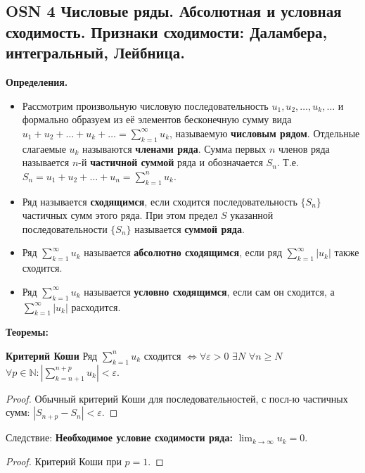 \subsection*{OSN 4 Числовые ряды. Абсолютная и условная сходимость. Признаки сходимости: Даламбера, интегральный, Лейбница.}

\textbf{Определения.}
\begin{itemize}
    \item Рассмотрим произвольную числовую последовательность $u_1,u_2,\dots,u_k,\dots$ и формально
    образуем из её элементов бесконечную сумму вида
    $u_1 +u_2 +\dots+u_k +\dots= \displaystyle \sum_{k=1}^{\infty}u_k$, называемую \textbf{числовым рядом}.
    Отдельные слагаемые $u_k$ называются \textbf{членами ряда}.
    Сумма первых $n$ членов ряда называется $n$-й \textbf{частичной суммой} ряда и обозначается $S_n$.
    Т.е. $S_n =u_1 +u_2 +\dots+u_n = \displaystyle \sum_{k=1}^n u_k$.
    \item Ряд называется \textbf{сходящимся}, если сходится последовательность $\{S_n\}$ частичных сумм этого ряда.
    При этом предел $S$ указанной последовательности $\{S_n\}$ называется \textbf{суммой ряда}.
    
    \item Ряд $\displaystyle \sum_{k=1}^{\infty}u_k$ называется \textbf{абсолютно сходящимся}, если ряд $\displaystyle \sum_{k=1}^{\infty}|u_k|$ также сходится.

    \item Ряд $\displaystyle \sum_{k=1}^{\infty}u_k$ называется \textbf{условно сходящимся}, если сам он сходится, а $\displaystyle \sum_{k=1}^{\infty}|u_k|$ расходится.
\end{itemize}

\textbf{Теоремы:}

\textbf{Критерий Коши} Ряд $\displaystyle \sum_{k=1}^n u_k$ сходится $\iff \forall \varepsilon > 0$ $\exists N$ $\forall n \geq N$ $ \forall p \in \mathbb{N} : \displaystyle \left|\sum_{k=n+1}^{n+p} u_k\right| < \varepsilon$.

\begin{proof}
    Обычный критерий Коши для последовательностей, с посл-ю частичных сумм: $|S_{n+p} - S_n| < \varepsilon$.
\end{proof}

Следствие: \textbf{Необходимое условие сходимости ряда:} $\lim_{k\rightarrow\infty} u_k=0$.

\begin{proof}
    Критерий Коши при $p = 1$.
\end{proof}

